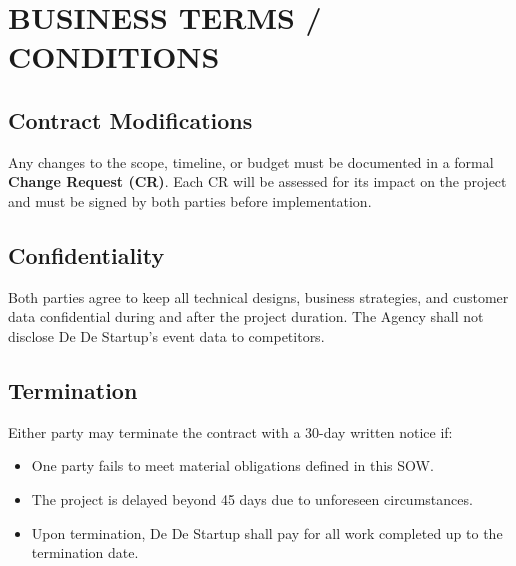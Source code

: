 \chapter{BUSINESS TERMS / CONDITIONS}

\section{Contract Modifications}
Any changes to the scope, timeline, or budget must be documented in a formal \textbf{Change Request (CR)}. Each CR will be assessed for its impact on the project and must be signed by both parties before implementation.

\section{Confidentiality}
Both parties agree to keep all technical designs, business strategies, and customer data confidential during and after the project duration. The Agency shall not disclose De De Startup’s event data to competitors.

\section{Termination}
Either party may terminate the contract with a 30-day written notice if:
\begin{itemize}
    \item One party fails to meet material obligations defined in this SOW.
    \item The project is delayed beyond 45 days due to unforeseen circumstances.
    \item Upon termination, De De Startup shall pay for all work completed up to the termination date.
\end{itemize}